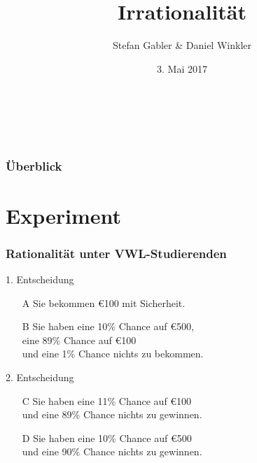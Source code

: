 \documentclass{beamer}
\title{Irrationalit\"at}
\author{Stefan Gabler \& Daniel Winkler}
\date{3. Mai 2017}
\begin{document}
\begin{frame}[plain]
  \titlepage
  \textcite{oliver2003quantitative}\\\\

\end{frame}

\begin{frame}
  \frametitle{\"Uberblick}
  \tableofcontents
\end{frame}

\section{Experiment}
\label{sec:experiment}

\begin{frame}  
 \frametitle{Rationalit\"at unter VWL-Studierenden}
  
    
      
  \begin{block}{1. Entscheidung}
   \begin{itemize}
      \item[A] Sie bekommen \euro 100  mit Sicherheit.
      \item[B] Sie haben eine 10\% Chance auf \euro 500,\\ eine 89\% Chance auf \euro 100\\ und eine 1\% Chance nichts zu bekommen.
     \end{itemize}

   \end{block}



    \begin{block}{2. Entscheidung}
      \begin{itemize}
      \item[C] Sie haben eine 11\% Chance auf \euro 100\\und eine 89\% Chance nichts zu gewinnen.
      \item[D] Sie haben eine 10\% Chance auf \euro 500\\und eine 90\% Chance nichts zu gewinnen.
      \end{itemize}
   \end{block}

  
  
 \end{frame}
\end{document}
